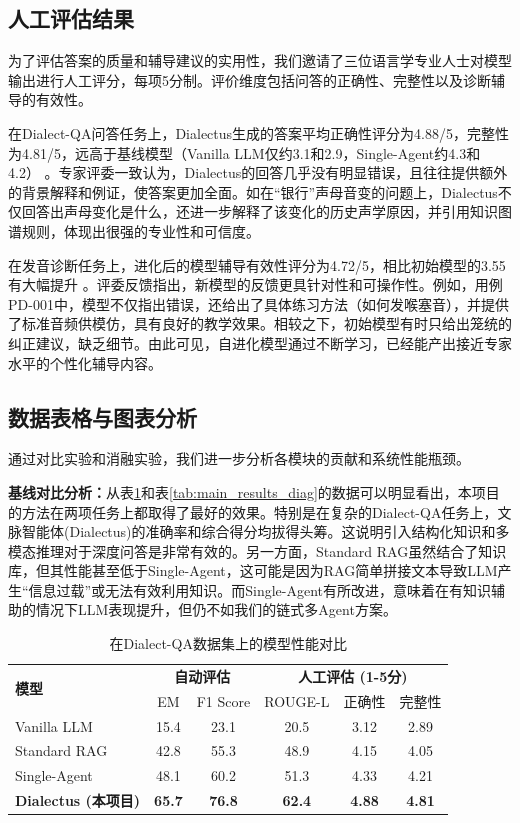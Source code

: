 \subsection{人工评估结果}
为了评估答案的质量和辅导建议的实用性，我们邀请了三位语言学专业人士对模型输出进行人工评分，每项5分制。评价维度包括问答的正确性、完整性以及诊断辅导的有效性。

在Dialect-QA问答任务上，Dialectus生成的答案平均正确性评分为4.88/5，完整性为4.81/5，远高于基线模型（Vanilla LLM仅约3.1和2.9，Single-Agent约4.3和4.2）  。专家评委一致认为，Dialectus的回答几乎没有明显错误，且往往提供额外的背景解释和例证，使答案更加全面。如在“银行”声母音变的问题上，Dialectus不仅回答出声母变化是什么，还进一步解释了该变化的历史声学原因，并引用知识图谱规则，体现出很强的专业性和可信度。

在发音诊断任务上，进化后的模型辅导有效性评分为4.72/5，相比初始模型的3.55有大幅提升 。评委反馈指出，新模型的反馈更具针对性和可操作性。例如，用例PD-001中，模型不仅指出错误，还给出了具体练习方法（如何发喉塞音），并提供了标准音频供模仿，具有良好的教学效果。相较之下，初始模型有时只给出笼统的纠正建议，缺乏细节。由此可见，自进化模型通过不断学习，已经能产出接近专家水平的个性化辅导内容。

\subsection{数据表格与图表分析}
通过对比实验和消融实验，我们进一步分析各模块的贡献和系统性能瓶颈。

\textbf{基线对比分析：}从表\ref{tab:main_results_qa}和表\ref{tab:main_results_diag}的数据可以明显看出，本项目的方法在两项任务上都取得了最好的效果。特别是在复杂的Dialect-QA任务上，文脉智能体(Dialectus)的准确率和综合得分均拔得头筹。这说明引入结构化知识和多模态推理对于深度问答是非常有效的。另一方面，Standard RAG虽然结合了知识库，但其性能甚至低于Single-Agent，这可能是因为RAG简单拼接文本导致LLM产生“信息过载”或无法有效利用知识。而Single-Agent有所改进，意味着在有知识辅助的情况下LLM表现提升，但仍不如我们的链式多Agent方案。
\begin{table}[H]
    \centering
    \caption{在Dialect-QA数据集上的模型性能对比}
    \label{tab:main_results_qa}
    \begin{tabular}{@{}l|cc|c|cc@{}}
        \toprule
        \multirow{2}{*}{\textbf{模型}} & \multicolumn{2}{c|}{\textbf{自动评估}} & \multicolumn{3}{c}{\textbf{人工评估 (1-5分)}} \\
        & EM & F1 Score & ROUGE-L & 正确性 & 完整性 \\
        \midrule
        Vanilla LLM & 15.4 & 23.1 & 20.5 & 3.12 & 2.89 \\
        Standard RAG & 42.8 & 55.3 & 48.9 & 4.15 & 4.05 \\
        Single-Agent & 48.1 & 60.2 & 51.3 & 4.33 & 4.21 \\
        \textbf{Dialectus (本项目)} & \textbf{65.7} & \textbf{76.8} & \textbf{62.4} & \textbf{4.88} & \textbf{4.81} \\
        \bottomrule
    \end{tabular}
\end{table}

